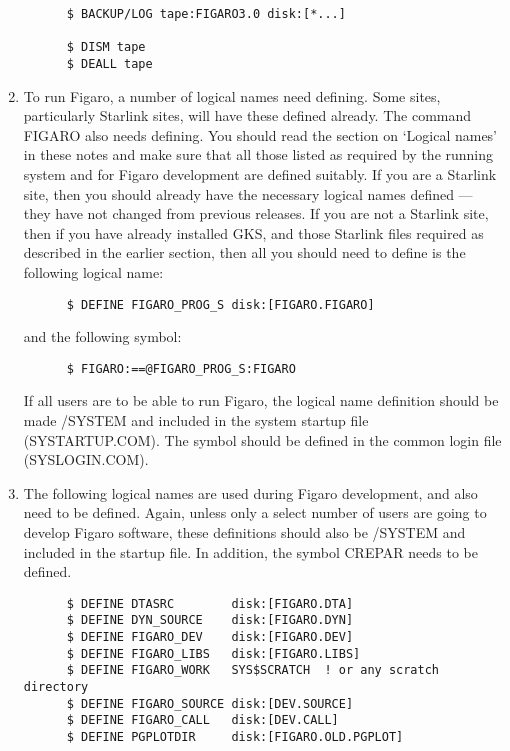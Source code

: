 \begin{enumerate}
\begin{verbatim}
      $ BACKUP/LOG tape:FIGARO3.0 disk:[*...]

      $ DISM tape
      $ DEALL tape
\end{verbatim}

\item To run Figaro, a number of logical names need defining.  Some sites, 
particularly  Starlink sites, will have these defined already.  The command
FIGARO also needs defining.  You should read  the  section on `Logical names'
in these notes and make sure that all those listed as required by the running 
system and  for Figaro development are defined suitably.  If you are a Starlink
site, then you should already have  the  necessary logical  names  defined ---
they have not changed from previous releases.  If you are not a Starlink site,
then if  you  have already  installed  GKS, and those Starlink files required
as described in the earlier section, then all you should need to define is the
following logical name:

\begin{verbatim}
      $ DEFINE FIGARO_PROG_S disk:[FIGARO.FIGARO]
\end{verbatim}

and the following symbol:

\begin{verbatim}
      $ FIGARO:==@FIGARO_PROG_S:FIGARO
\end{verbatim}
       
If all users are to be able to run Figaro, the  logical  name definition 
should be made /SYSTEM and included in the system startup file (SYSTARTUP.COM). 
The symbol should  be  defined in the common login file (SYSLOGIN.COM).

\item The  following  logical  names are used during Figaro
development, and also need to be defined.  Again, unless only a  select  number 
of  users  are  going  to  develop  Figaro software,  these  definitions 
should  also  be  /SYSTEM  and included in the startup file.  In addition, the
symbol CREPAR needs to be defined.

\begin{verbatim}
      $ DEFINE DTASRC        disk:[FIGARO.DTA]
      $ DEFINE DYN_SOURCE    disk:[FIGARO.DYN]
      $ DEFINE FIGARO_DEV    disk:[FIGARO.DEV]
      $ DEFINE FIGARO_LIBS   disk:[FIGARO.LIBS]
      $ DEFINE FIGARO_WORK   SYS$SCRATCH  ! or any scratch directory
      $ DEFINE FIGARO_SOURCE disk:[DEV.SOURCE]
      $ DEFINE FIGARO_CALL   disk:[DEV.CALL]
      $ DEFINE PGPLOTDIR     disk:[FIGARO.OLD.PGPLOT]
  

\end{verbatim}
\end{enumerate}
